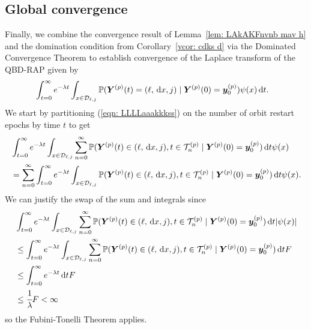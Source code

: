 \subsection{Global convergence}\label{sec: sub global}
Finally, we combine the convergence result of Lemma~\ref{lem: LAkAKFnvnb mav h} and the domination condition from Corollary~\ref{vcor: cdks d} via the Dominated Convergence Theorem to establish convergence of the Laplace transform of the QBD-RAP given by 
\begin{align}
	&\int_{t=0}^\infty e^{-\lambda t}\int_{x\in\mathcal D_{\ell,j}}\mathbb P( {\boldsymbol Y}^{(p)}(t) = (\ell,\, \mathrm{d} x,j)\mid \boldsymbol Y^{(p)}(0)=\boldsymbol y_0^{(p)})  \psi(x)\, \mathrm{d} t. \label{eqn: LLLLaaakkkss}
\end{align}
We start by partitioning (\ref{eqn: LLLLaaakkkss}) on the number of orbit restart epochs by time \(t\) to get
\begin{align}
	& \int_{t=0}^\infty e^{-\lambda t}\int_{x\in\mathcal D_{\ell,j}}\sum_{n=0}^\infty \mathbb P(  {\boldsymbol Y}^{(p)}(t) \in (\ell, \, \mathrm{d} x, j), t\in\mathcal T_n^{(p)} \mid\nonumber 
	\boldsymbol Y^{(p)}(0)=\boldsymbol y_0^{(p)})\, \mathrm{d} t \psi(x) \nonumber
	\\&=\sum_{n=0}^\infty\int_{t=0}^\infty e^{-\lambda t}\int_{x\in\mathcal D_{\ell,j}} \mathbb P( {\boldsymbol Y}^{(p)}(t) \in (\ell, \, \mathrm{d} x, j), t\in\mathcal T_n^{(p)} \mid  
	\boldsymbol Y^{(p)}(0)=\boldsymbol y_0^{(p)})\, \mathrm{d} t \psi(x). \label{eqn: KLDNVnav}
\end{align}
We can justify the swap of the sum and integrals since 
\begin{align}
	& \int_{t=0}^\infty e^{-\lambda t}\int_{x\in\mathcal D_{\ell,j}}\sum_{n=0}^\infty \mathbb P(  {\boldsymbol Y}^{(p)}(t) \in (\ell, \, \mathrm{d} x, j), t\in\mathcal T_n^{(p)} \mid\nonumber 
	\boldsymbol Y^{(p)}(0)=\boldsymbol y_0^{(p)})\, \mathrm{d} t |\psi(x)| \nonumber
	\\&\leq \int_{t=0}^\infty e^{-\lambda t}\int_{x\in\mathcal D_{\ell,j}}\sum_{n=0}^\infty \mathbb P(  {\boldsymbol Y}^{(p)}(t) \in (\ell, \, \mathrm{d} x, j), t\in\mathcal T_n^{(p)} \mid\nonumber 
	\boldsymbol Y^{(p)}(0)=\boldsymbol y_0^{(p)})\, \mathrm{d} t F \nonumber
	\\&\leq \int_{t=0}^\infty e^{-\lambda t}\, \mathrm{d} t F \nonumber
	\\&\leq \cfrac{1}{\lambda} F<\infty \nonumber
\end{align}
so the Fubini-Tonelli Theorem applies.

